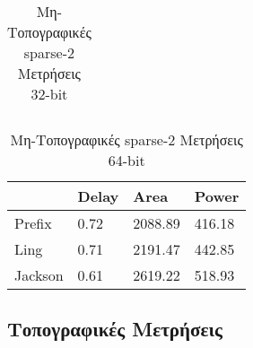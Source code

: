 \begin{multicols}{2}
\begin{table}[H]
\begin{tabular}{||p{1.2cm} | p{0.7cm} p{1cm} p{1cm}||}
        \hline
    \end{tabular}
\caption{Μη-Τοπογραφικές sparse-2 Μετρήσεις 32-bit}
\label{topo_sparse2_result_table_32}
\end{table}
\begin{table}[H]
\centering
     \begin{tabular}{||p{1.2cm} | p{0.7cm} p{1cm} p{1cm}||} 
        \hline
         & Delay & Area & Power \\ [0.5ex] 
        \hline\hline
        Prefix  & 0.72  & 2088.89    & 416.18 \\ 
        \hline
        Ling    & 0.71  & 2191.47    & 442.85 \\
        \hline
        Jackson & 0.61  & 2619.22    & 518.93 \\
        \hline
    \end{tabular}
\caption{Μη-Τοπογραφικές sparse-2 Μετρήσεις 64-bit}
\label{topo_sparse2_result_table_64}
\end{table}
\end{multicols}
















\subsection{Τοπογραφικές Μετρήσεις}

